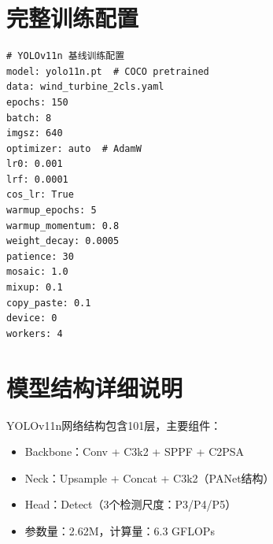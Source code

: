 \documentclass[12pt,a4paper]{article}
\begin{document}
\newpage
\appendix
\section{完整训练配置}

\begin{verbatim}
# YOLOv11n 基线训练配置
model: yolo11n.pt  # COCO pretrained
data: wind_turbine_2cls.yaml
epochs: 150
batch: 8
imgsz: 640
optimizer: auto  # AdamW
lr0: 0.001
lrf: 0.0001
cos_lr: True
warmup_epochs: 5
warmup_momentum: 0.8
weight_decay: 0.0005
patience: 30
mosaic: 1.0
mixup: 0.1
copy_paste: 0.1
device: 0
workers: 4
\end{verbatim}

\section{模型结构详细说明}

YOLOv11n网络结构包含101层，主要组件：
\begin{itemize}[noitemsep]
  \item Backbone：Conv + C3k2 + SPPF + C2PSA
  \item Neck：Upsample + Concat + C3k2（PANet结构）
  \item Head：Detect（3个检测尺度：P3/P4/P5）
  \item 参数量：2.62M，计算量：6.3 GFLOPs
\end{itemize}
\end{document}
